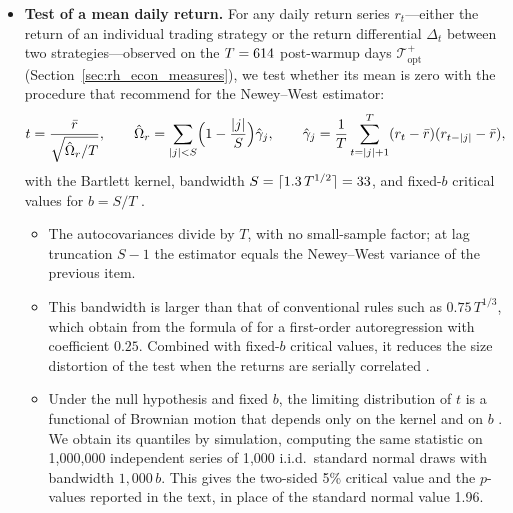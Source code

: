 \begin{itemize}
\item \textbf{Test of a mean daily return.} For any daily return series $r_t$---either the return of an individual trading strategy or the return differential $\Delta_t$ between two strategies---observed on the $T = 614$ post-warmup days $\mathcal T_{\mathrm{opt}}^{+}$ (Section~\ref{sec:rh_econ_measures}), we test whether its mean is zero with the procedure that \citet{LazarusLewisStockWatson2018} recommend for the Newey--West estimator:
  \[
    t = \frac{\bar r}{\sqrt{\hat\Omega_r / T}},
    \qquad
    \hat\Omega_r = \sum_{|j| < S} \Bigl(1 - \frac{|j|}{S}\Bigr) \hat\gamma_j,
    \qquad
    \hat\gamma_j = \frac{1}{T} \sum_{t=|j|+1}^{T} (r_t - \bar r)(r_{t-|j|} - \bar r),
  \]
  with the Bartlett kernel, bandwidth $S = \lceil 1.3\, T^{1/2} \rceil = 33$, and fixed-$b$ critical values for $b = S/T$ \citep{KieferVogelsang2005}.
  \begin{itemize}
  \item The autocovariances divide by $T$, with no small-sample factor; at lag truncation $S - 1$ the estimator equals the Newey--West variance of the previous item.
  \item This bandwidth is larger than that of conventional rules such as $0.75\, T^{1/3}$, which \citet{LazarusLewisStockWatson2018} obtain from the formula of \citet{Andrews1991} for a first-order autoregression with coefficient $0.25$. Combined with fixed-$b$ critical values, it reduces the size distortion of the test when the returns are serially correlated \citep{LazarusLewisStockWatson2018}.
  \item Under the null hypothesis and fixed $b$, the limiting distribution of $t$ is a functional of Brownian motion that depends only on the kernel and on $b$ \citep{KieferVogelsang2005}. We obtain its quantiles by simulation, computing the same statistic on 1{,}000{,}000 independent series of 1{,}000 i.i.d.\ standard normal draws with bandwidth $1{,}000\,b$. This gives the two-sided 5\% critical value \rheHACCV{} and the $p$-values reported in the text, in place of the standard normal value 1.96.
  \end{itemize}

\end{itemize}
